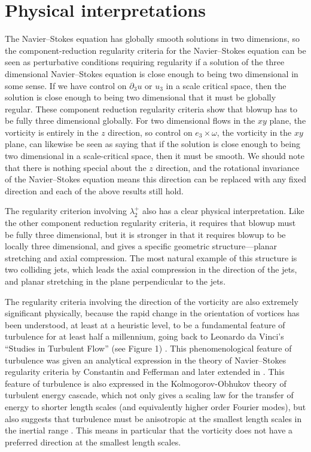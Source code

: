 \documentclass[11pt]{article}
\theoremstyle{plain}
\theoremstyle{remark}
\numberwithin{equation}{section}
\begin{document}
\section{Physical interpretations}

The Navier--Stokes equation has globally smooth solutions in two dimensions, so the component-reduction regularity criteria for the Navier--Stokes equation can be seen as perturbative conditions requiring regularity if a solution of the three dimensional Navier--Stokes equation is close enough to being two dimensional in some sense. If we have control on $\partial_3 u$ or $u_3$ in a scale critical space, then the solution is close enough to being two dimensional that it must be globally regular.
These component reduction regularity criteria show that blowup has to be fully three dimensional globally.
For two dimensional flows in the $xy$ plane, the vorticity is entirely in the $z$ direction, so control on $e_3\times \omega$, the vorticity in the $xy$ plane, can likewise be seen as saying that if the solution is close enough to being two dimensional in a scale-critical space, then it must be smooth. We should note that there is nothing special about the $z$ direction, and the rotational invariance of the Navier--Stokes equation means this direction can be replaced with any fixed direction and each of the above results still hold.

The regularity criterion involving $\lambda_2^+$ also has a clear physical interpretation. Like the other component reduction regularity criteria, it requires that blowup must be fully three dimensional, but it is stronger in that it requires blowup to be locally three dimensional, and gives a specific geometric structure---planar stretching and axial compression. The most natural example of this structure is two colliding jets, which leads the axial compression in the direction of the jets, and planar stretching in the plane perpendicular to the jets.

The regularity criteria involving the direction of the vorticity are also extremely significant physically, because the rapid change in the orientation of vortices has been understood, at least at a heuristic level, to be a fundamental feature of turbulence for at least half a millennium, going back to Leonardo da Vinci's ``Studies in Turbulent Flow'' (see Figure 1) \cite{NatureDaVinci}. This phenomenological feature of turbulence was given an analytical expression in the theory of Navier--Stokes regularity criteria by Constantin and Fefferman \cite{ConstantinFefferman} and later extended in \cite{daVeigaBerselli}.
This feature of turbulence is also expressed in the Kolmogorov-Obhukov theory of turbulent energy cascade, which not only gives a scaling law for the transfer of energy to shorter length scales (and equivalently higher order Fourier modes), but also suggests that turbulence must be anisotropic at the smallest length scales in the inertial range \cites{Kolmogorov,Obukhov}. This means in particular that the vorticity does not have a preferred direction at the smallest length scales.
\end{document}
